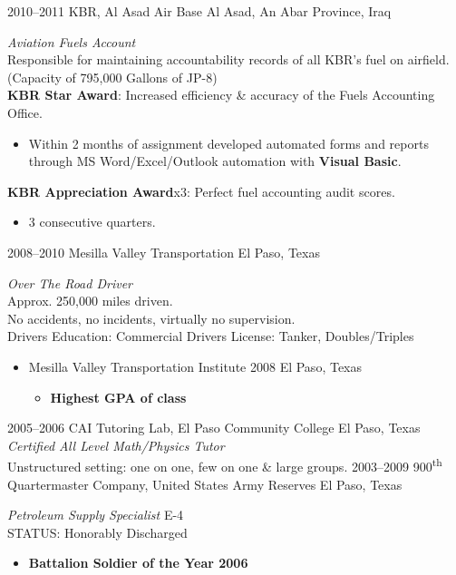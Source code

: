 \documentclass[]{friggeri-cv} %
\begin{document}
\begin{entrylist}
\entry
{2010--2011}
{KBR, Al Asad Air Base}
{Al Asad, An Abar Province, Iraq}
{\emph{Aviation Fuels Account} \\
Responsible for maintaining accountability records of all KBR's fuel on airfield. 
(Capacity of 795,000 Gallons of JP-8) \\
\textbf{KBR Star Award}: Increased efficiency \& accuracy of the Fuels Accounting Office.
\begin{itemize}
\item Within 2 months of assignment developed automated forms and reports through MS Word/Excel/Outlook automation with \textbf{Visual Basic}.
\end{itemize}
\textbf{KBR Appreciation Award}x3: Perfect fuel accounting audit scores.
\begin{itemize}
\item 3 consecutive quarters.
\end{itemize}}
\entry
{2008--2010}
{Mesilla Valley Transportation}
{El Paso, Texas}
{\emph{Over The Road Driver} \\
Approx. 250,000 miles driven. \\
No accidents, no incidents, virtually no supervision. \\
Drivers Education: Commercial Drivers License: Tanker, Doubles/Triples
\begin{itemize}
\item Mesilla Valley Transportation Institute 2008 El Paso, Texas
\begin{itemize}
\item \textbf{Highest GPA of class}
\end{itemize}
\end{itemize}}
\entry
{2005--2006}
{CAI Tutoring Lab, El Paso Community College}
{El Paso, Texas}
{\emph{Certified All Level Math/Physics Tutor} \\
Unstructured setting: one on one, few on one \& large groups.}
\entry
{2003--2009}
{900\textsuperscript{th} Quartermaster Company, United States Army Reserves}
{El Paso, Texas}
{\emph{Petroleum Supply Specialist} E-4 \\
STATUS: Honorably Discharged
\begin{itemize}
\item \textbf{Battalion Soldier of the Year 2006}

\end{itemize}}
\end{entrylist}
\end{document}

